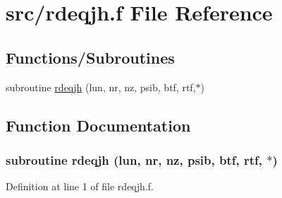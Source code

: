 \hypertarget{rdeqjh_8f}{
\section{src/rdeqjh.f File Reference}
\label{rdeqjh_8f}
}
\subsection*{Functions/Subroutines}
\begin{CompactItemize}
\item 
subroutine \hyperlink{rdeqjh_8f_69474b4e13362274ce3461aec98ffc3c}{rdeqjh} (lun, nr, nz, psib, btf, rtf,$\ast$)
\end{CompactItemize}


\subsection{Function Documentation}
\hypertarget{rdeqjh_8f_69474b4e13362274ce3461aec98ffc3c}{
\subsubsection[rdeqjh]{\setlength{\rightskip}{0pt plus 5cm}subroutine rdeqjh (lun, \/  nr, \/  nz, \/  psib, \/  btf, \/  rtf, \/  $\ast$)}}
\label{rdeqjh_8f_69474b4e13362274ce3461aec98ffc3c}




Definition at line 1 of file rdeqjh.f.